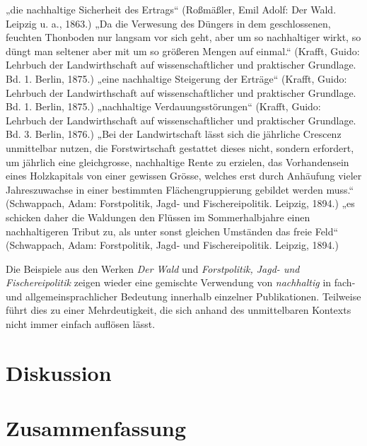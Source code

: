 \documentclass[
    german,
    a4paper,%
    12pt,%
    oneside,%
    toc=bibliography,
    final,
]{scrartcl}
\begin{document}
\begin{exe}
\ex \label{ex-1846-1915-forst-allg-1} „die nachhaltige Sicherheit des Ertrags“ (Roßmäßler, Emil Adolf: Der Wald. Leipzig u. a., 1863.)
\ex „Da die Verwesung des Düngers in dem geschlossenen, feuchten Thonboden nur langsam vor sich geht, aber um so nachhaltiger wirkt, so düngt man seltener aber mit um so größeren Mengen auf einmal.“ (Krafft, Guido: Lehrbuch der Landwirthschaft auf wissenschaftlicher und praktischer Grundlage. Bd. 1. Berlin, 1875.)
\ex „eine nachhaltige Steigerung der Erträge“ (Krafft, Guido: Lehrbuch der Landwirthschaft auf wissenschaftlicher und praktischer Grundlage. Bd. 1. Berlin, 1875.)
\ex „nachhaltige Verdauungsstörungen“ (Krafft, Guido: Lehrbuch der Landwirthschaft auf wissenschaftlicher und praktischer Grundlage. Bd. 3. Berlin, 1876.)
\ex „Bei der Landwirtschaft lässt sich die jährliche Crescenz unmittelbar nutzen, die Forstwirtschaft gestattet dieses nicht, sondern erfordert, um jährlich eine gleichgrosse, nachhaltige Rente zu erzielen, das Vorhandensein eines Holzkapitals von einer gewissen Grösse, welches erst durch Anhäufung vieler Jahreszuwachse in einer bestimmten Flächengruppierung gebildet werden muss.“ (Schwappach, Adam: Forstpolitik, Jagd- und Fischereipolitik. Leipzig, 1894.)
\ex \label{ex-1846-1915-forst-allg-n} „es schicken daher die Waldungen den Flüssen im Sommerhalbjahre einen nachhaltigeren Tribut zu, als unter sonst gleichen Umständen das freie Feld“ (Schwappach, Adam: Forstpolitik, Jagd- und Fischereipolitik. Leipzig, 1894.)
\end{exe}

Die Beispiele aus den Werken \textit{Der Wald} und \textit{Forstpolitik, Jagd- und Fischereipolitik} zeigen wieder eine gemischte Verwendung von \textit{nachhaltig} in fach- und allgemeinsprachlicher Bedeutung innerhalb einzelner Publikationen. Teilweise führt dies zu einer Mehrdeutigkeit, die sich anhand des unmittelbaren Kontexts nicht immer einfach auflösen lässt.

\section{Diskussion}
\label{sec:diskussion}


\section{Zusammenfassung}
\label{sec:zusammenfassung}
\end{document}
